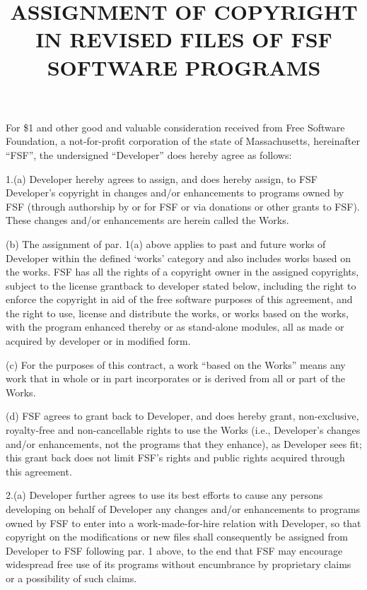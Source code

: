\documentclass[a4paper,12pt]{article}
\title{\large\sffamily\bfseries
ASSIGNMENT OF COPYRIGHT IN REVISED FILES OF FSF SOFTWARE PROGRAMS}
\begin{document}
 
 
\maketitle

 For \$1 and other good and valuable consideration received from 
 Free Software Foundation, a not-for-profit corporation of the 
 state of Massachusetts, hereinafter ``FSF'', the undersigned 
 ``Developer'' does hereby agree as follows:
 
 1.(a) Developer hereby agrees to assign, and does hereby assign, to FSF
 Developer's copyright in changes and/or enhancements to programs owned
 by FSF (through authorship by or for FSF or via donations or other
 grants to FSF).  These changes and/or enhancements are herein called
 the Works.
 
 (b) The assignment of par. 1(a) above applies to past and future works
 of Developer within the defined `works' category and also includes
 works based on the works.  FSF has all the rights of a copyright owner
 in the assigned copyrights, subject to the license grantback to
 developer stated below, including the right to enforce the copyright
 in aid of the free software purposes of this agreement, and the right
 to use, license and distribute the works, or works based on the works,
 with the program enhanced thereby or as stand-alone modules, all as
 made or acquired by developer or in modified form.
 
 (c) For the purposes of this contract, a work ``based on the Works''
 means any work that in whole or in part incorporates or is derived
 from all or part of the Works.
 
 (d) FSF agrees to grant back to Developer, and does hereby grant,
 non-exclusive, royalty-free and non-cancellable rights to use the
 Works (i.e., Developer's changes and/or enhancements, not the programs
 that they enhance), as Developer sees fit; this grant back does not
 limit FSF's rights and public rights acquired through this agreement.
 
 2.(a) Developer further agrees to use its best efforts to cause any
 persons developing on behalf of Developer any changes and/or
 enhancements to programs owned by FSF to enter into a
 work-made-for-hire relation with Developer, so that copyright on the
 modifications or new files shall consequently be assigned from
 Developer to FSF following par. 1 above, to the end that FSF may
 encourage widespread free use of its programs without encumbrance by
 proprietary claims or a possibility of such claims.
 
\end{document}

